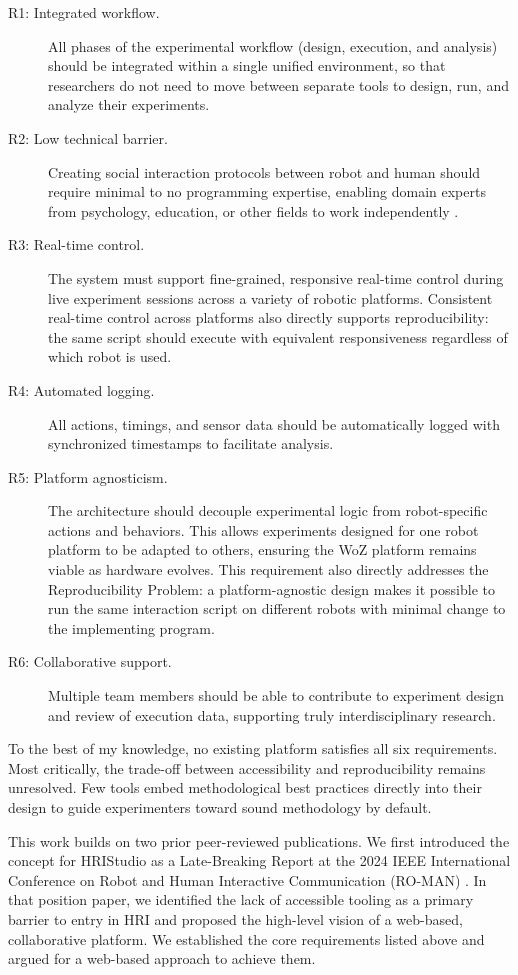\begin{description}
\item[R1: Integrated workflow.] All phases of the experimental workflow (design, execution, and analysis) should be integrated within a single unified environment, so that researchers do not need to move between separate tools to design, run, and analyze their experiments.
\item[R2: Low technical barrier.] Creating social interaction protocols between robot and human should require minimal to no programming expertise, enabling domain experts from psychology, education, or other fields to work independently \cite{Bartneck2024}.
\item[R3: Real-time control.] The system must support fine-grained, responsive real-time control during live experiment sessions across a variety of robotic platforms. Consistent real-time control across platforms also directly supports reproducibility: the same script should execute with equivalent responsiveness regardless of which robot is used.
\item[R4: Automated logging.] All actions, timings, and sensor data should be automatically logged with synchronized timestamps to facilitate analysis.
\item[R5: Platform agnosticism.] The architecture should decouple experimental logic from robot-specific actions and behaviors. This allows experiments designed for one robot platform to be adapted to others, ensuring the WoZ platform remains viable as hardware evolves. This requirement also directly addresses the Reproducibility Problem: a platform-agnostic design makes it possible to run the same interaction script on different robots with minimal change to the implementing program.
\item[R6: Collaborative support.] Multiple team members should be able to contribute to experiment design and review of execution data, supporting truly interdisciplinary research.
\end{description}

To the best of my knowledge, no existing platform satisfies all six requirements. Most critically, the trade-off between accessibility and reproducibility remains unresolved. Few tools embed methodological best practices directly into their design to guide experimenters toward sound methodology by default.

This work builds on two prior peer-reviewed publications. We first introduced the concept for HRIStudio as a Late-Breaking Report at the 2024 IEEE International Conference on Robot and Human Interactive Communication (RO-MAN) \cite{OConnor2024}. In that position paper, we identified the lack of accessible tooling as a primary barrier to entry in HRI and proposed the high-level vision of a web-based, collaborative platform. We established the core requirements listed above and argued for a web-based approach to achieve them.


